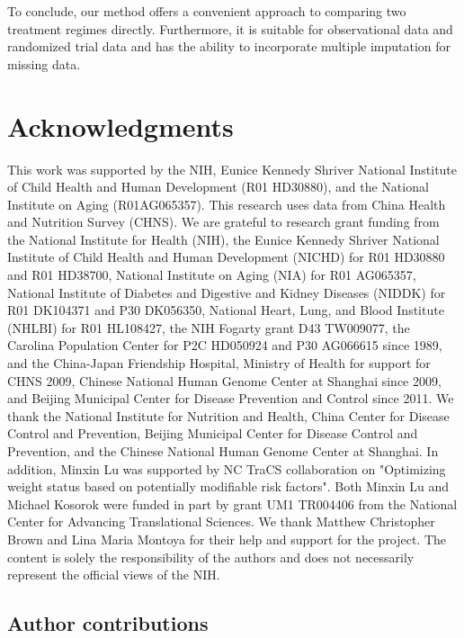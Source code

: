 \documentclass{article}
\begin{document}
To conclude, our method offers a convenient approach to comparing two treatment regimes directly. Furthermore, it is suitable for observational data and randomized trial data and has the ability to incorporate multiple imputation for missing data.

 



\section*{Acknowledgments}
This work was supported by the NIH, Eunice Kennedy Shriver National Institute of Child Health and Human Development (R01 HD30880), and the National Institute on Aging (R01AG065357). This research uses data from China Health and Nutrition Survey (CHNS). We are grateful to research grant funding from the National Institute for Health (NIH), the Eunice Kennedy Shriver National Institute of Child Health and Human Development (NICHD) for R01 HD30880 and R01 HD38700, National Institute on Aging (NIA) for R01 AG065357, National Institute of Diabetes and Digestive and Kidney Diseases (NIDDK) for R01 DK104371 and P30 DK056350, National Heart, Lung, and Blood Institute (NHLBI) for R01 HL108427, the NIH Fogarty grant D43 TW009077, the Carolina Population Center for P2C HD050924 and P30 AG066615 since 1989, and the China-Japan Friendship Hospital, Ministry of Health for support for CHNS 2009, Chinese National Human Genome Center at Shanghai since 2009, and Beijing Municipal Center for Disease Prevention and Control since 2011. We thank the National Institute for Nutrition and Health, China Center for Disease Control and Prevention, Beijing Municipal Center for Disease Control and Prevention, and the Chinese National Human Genome Center at Shanghai. In addition, Minxin Lu was supported by NC TraCS collaboration on "Optimizing weight status based on potentially modifiable risk factors". Both Minxin Lu and Michael Kosorok were funded in part by grant UM1 TR004406 from the National Center for Advancing Translational Sciences. We thank Matthew Christopher Brown and Lina Maria Montoya for their help and support for the project. The content is solely the responsibility of the authors and does not necessarily represent the official views of the NIH.

\subsection*{Author contributions}
\end{document}
